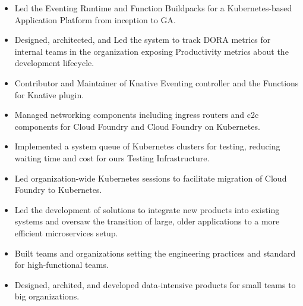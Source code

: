\documentclass[10pt,a4paper,ragged2e,withhyper]{altacv}
\begin{document}
\begin{paracol}{2}


\begin{itemize}
    \item Led the Eventing Runtime and Function Buildpacks for a Kubernetes-based Application Platform from inception to GA.
    \item Designed, architected, and Led the system to track DORA metrics for internal teams in the organization exposing Productivity metrics about the development lifecycle.
    \item Contributor and Maintainer of Knative Eventing controller and the Functions for Knative plugin.
\end{itemize}
\divider

\begin{itemize}
    \item Managed networking components including ingress routers and c2c components for Cloud Foundry and Cloud Foundry on Kubernetes.
    \item Implemented a system queue of Kubernetes clusters for testing, reducing waiting time and cost for ours Testing Infrastructure.
    \item Led organization-wide Kubernetes sessions to facilitate migration of Cloud Foundry to Kubernetes.
\end{itemize}

\divider

\begin{itemize}
    \item Led the development of solutions to integrate new products into existing systems and oversaw the transition of large, older applications to a more efficient microservices setup.
    \item Built teams and organizations setting the engineering practices and standard for high-functional teams.
\end{itemize}

\divider

\begin{itemize}
    \item Designed, archited, and developed data-intensive products for small teams to big organizations.
\end{itemize}


\end{paracol}
\end{document}
